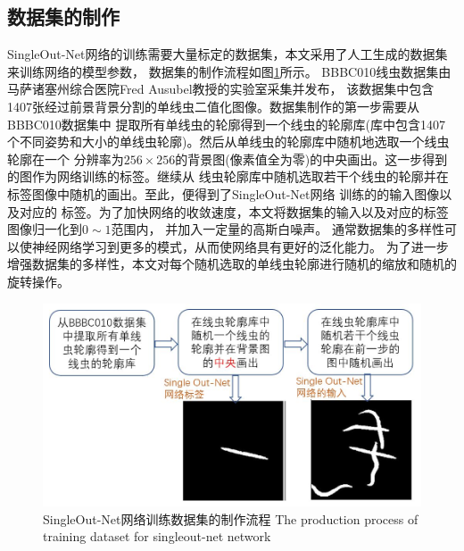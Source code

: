 \subsection{数据集的制作}
\label{dataset}
	SingleOut-Net网络的训练需要大量标定的数据集，本文采用了人工生成的数据集来训练网络的模型参数，
	数据集的制作流程如图\ref{fig:chap4:dataset}所示。
	BBBC010线虫数据集\cite{Ljosa2012Annotated}由马萨诸塞州综合医院Fred Ausubel教授的实验室采集并发布，
	该数据集中包含1407张经过前景背景分割的单线虫二值化图像。数据集制作的第一步需要从BBBC010数据集中
	提取所有单线虫的轮廓得到一个线虫的轮廓库(库中包含1407个不同姿势和大小的单线虫轮廓)。然后从单线虫的轮廓库中随机地选取一个线虫轮廓在一个
	分辨率为$256\times256$的背景图(像素值全为零)的中央画出。这一步得到的图作为网络训练的标签。继续从
	线虫轮廓库中随机选取若干个线虫的轮廓并在标签图像中随机的画出。至此，便得到了SingleOut-Net网络
	训练的的输入图像以及对应的
	标签。为了加快网络的收敛速度，本文将数据集的输入以及对应的标签图像归一化到$0\sim1$范围内，
	并加入一定量的高斯白噪声。
	通常数据集的多样性可以使神经网络学习到更多的模式，从而使网络具有更好的泛化能力。
	为了进一步增强数据集的多样性，本文对每个随机选取的单线虫轮廓进行随机的缩放和随机的旋转操作。
	\begin{figure}[htb]
	  \centering
	  \includegraphics[width=12cm]{figure/chap4/dataset.jpg}
	  \bicaption
		{SingleOut-Net网络训练数据集的制作流程}
		{The production process of  training dataset for singleout-net network}
	  \label{fig:chap4:dataset}
	\end{figure}
